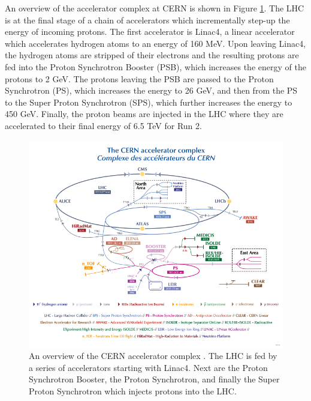 An overview of the accelerator complex at CERN is shown in Figure \ref{fig: accelerator-complex}. The \ac{LHC} is at the final stage of a chain of accelerators which incrementally step-up the energy of incoming protons. The first accelerator is Linac4, a linear accelerator which accelerates hydrogen atoms to an energy of 160 MeV. Upon leaving Linac4, the hydrogen atoms are stripped of their electrons and the resulting protons are fed into the Proton Synchrotron Booster (PSB), which increases the energy of the protons to 2 GeV. The protons leaving the PSB are passed to the Proton Synchrotron (PS), which increases the energy to 26 GeV, and then from the PS to the Super Proton Synchrotron (SPS), which further increases the energy to 450 GeV. Finally, the proton beams are injected in the \ac{LHC} where they are accelerated to their final energy of 6.5 TeV for Run 2.

\begin{figure}[htb!]
\includegraphics[width=\textwidth]{images/2-LHC-ATLAS/accelerator_complex.pdf}
\caption{An overview of the CERN accelerator complex \cite{CERN:2012:accelerators}. The \ac{LHC} is fed by a series of accelerators starting with Linac4. Next are the Proton Synchrotron Booster, the Proton Synchrotron, and finally the Super Proton Synchrotron which injects protons into the \ac{LHC}.}
\label{fig: accelerator-complex}
\end{figure}



